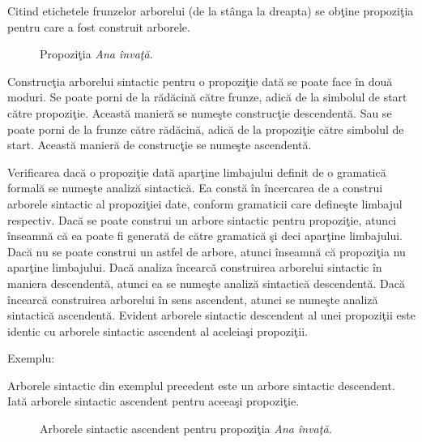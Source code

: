 Citind etichetele frunzelor arborelui (de la stânga la dreapta) se obţine propoziţia pentru care a fost construit arborele.

\begin{figure}[H]
\centering
{} 
\caption{Propoziţia \textit{Ana învaţă.}}
\end{figure}

Construcţia arborelui sintactic pentru o propoziţie dată se poate face în două moduri. Se poate porni de la rădăcină către frunze, adică de la simbolul de start către propoziţie. Această manieră se numeşte construcţie descendentă. Sau se poate porni de la frunze către rădăcină, adică de la propoziţie către simbolul de start. Această manieră de construcţie se numeşte ascendentă.

Verificarea dacă o propoziţie dată aparţine limbajului definit de o gramatică formală se numeşte analiză sintactică. Ea constă în încercarea de a construi arborele sintactic al propoziţiei date, conform gramaticii care defineşte limbajul respectiv. Dacă se poate construi un arbore sintactic pentru propoziţie, atunci înseamnă că ea poate fi generată de către gramatică şi deci aparţine limbajului. Dacă nu se poate construi un astfel de arbore, atunci înseamnă că propoziţia nu aparţine limbajului. Dacă analiza încearcă construirea arborelui sintactic în maniera descendentă, atunci ea se numeşte analiză sintactică descendentă. Dacă încearcă construirea arborelui în sens ascendent, atunci se numeşte analiză sintactică ascendentă. Evident arborele sintactic descendent al unei propoziţii este identic cu arborele sintactic ascendent al aceleiaşi propoziţii.

Exemplu:

Arborele sintactic din exemplul precedent este un arbore sintactic descendent. Iată arborele sintactic ascendent pentru aceeaşi propoziţie.

\begin{figure}[H]
\centering
{}
\caption{Arborele sintactic ascendent pentru propoziţia \textit{Ana învaţă.}}
\end{figure}

